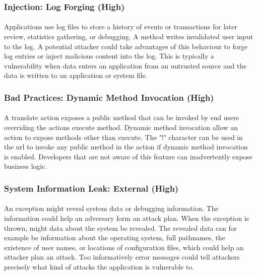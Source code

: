 \documentclass[11pt,english,a4paper]{report}
\begin{document}
\subsubsection{Injection: Log Forging (High)}
\paragraph{}
Applications use log files to store a history of events or transactions for later review, statistics gathering, or debugging.
A method writes invalidated user input to the log.
A potential attacker could take advantages of this behaviour to forge log entries or inject malicious content into the log.
This is typically a vulnerability when data enters an application from an untrusted source and the data is written to an application or system file.

\subsubsection{Bad Practices: Dynamic Method Invocation (High)}
\paragraph{}
A translate action exposes a public method that can be invoked by end users overriding the actions execute method.
Dynamic method invocation allow an action to expose methods other than execute.
The "!" character can be used in the \gls{url} to invoke any public method in the action if dynamic method invocation is enabled.
Developers that are not aware of this feature can inadvertently expose business logic. 

\subsubsection{System Information Leak: External (High)}
\paragraph{}
An exception might reveal system data or debugging information. 
The information could help an adversary form an attack plan.
When the exception is thrown, might data about the system be revealed. 
The revealed data can for example be information about the operating system, full pathnames, the existence of user names, or locations of configuration files, which could help an attacker plan an attack.
Too informatively error messages could tell attackers precisely what kind of attacks the application is vulnerable to.
\end{document}
